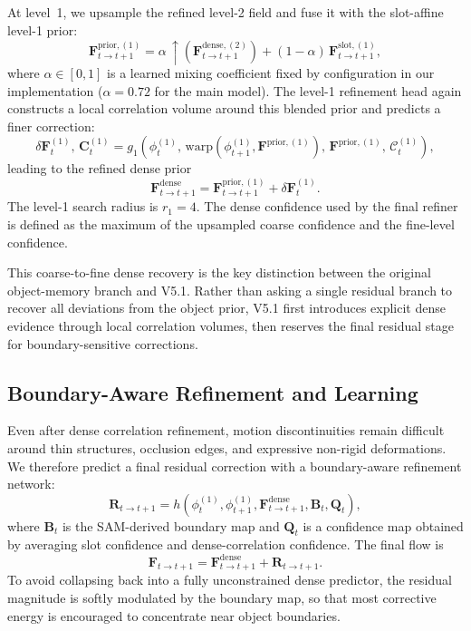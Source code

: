 At level~1, we upsample the refined level-2 field and fuse it with the slot-affine level-1 prior:
\begin{equation}
\label{eq:prior_blend}
\mathbf{F}^{\mathrm{prior},(1)}_{t\rightarrow t+1} = \alpha\,\uparrow\!\left(\mathbf{F}^{\mathrm{dense},(2)}_{t\rightarrow t+1}\right) + (1-\alpha)\,\mathbf{F}^{\mathrm{slot},(1)}_{t\rightarrow t+1},
\end{equation}
where $\alpha\in[0,1]$ is a learned mixing coefficient fixed by configuration in our implementation ($\alpha=0.72$ for the main model). The level-1 refinement head again constructs a local correlation volume around this blended prior and predicts a finer correction:
\begin{equation}
\delta \mathbf{F}_t^{(1)},\, \mathbf{C}_t^{(1)} = g_1\left(\phi_t^{(1)},\, \mathrm{warp}(\phi_{t+1}^{(1)},\mathbf{F}^{\mathrm{prior},(1)}),\, \mathbf{F}^{\mathrm{prior},(1)},\, \mathcal{C}_t^{(1)}\right),
\end{equation}
leading to the refined dense prior
\begin{equation}
\label{eq:dense_prior}
\mathbf{F}^{\mathrm{dense}}_{t\rightarrow t+1} = \mathbf{F}^{\mathrm{prior},(1)}_{t\rightarrow t+1} + \delta \mathbf{F}_t^{(1)}.
\end{equation}
The level-1 search radius is $r_1=4$. The dense confidence used by the final refiner is defined as the maximum of the upsampled coarse confidence and the fine-level confidence.

This coarse-to-fine dense recovery is the key distinction between the original object-memory branch and V5.1. Rather than asking a single residual branch to recover all deviations from the object prior, V5.1 first introduces explicit dense evidence through local correlation volumes, then reserves the final residual stage for boundary-sensitive corrections.

\subsection{Boundary-Aware Refinement and Learning}

Even after dense correlation refinement, motion discontinuities remain difficult around thin structures, occlusion edges, and expressive non-rigid deformations. We therefore predict a final residual correction with a boundary-aware refinement network:
\begin{equation}
\mathbf{R}_{t\rightarrow t+1} = h\left(\phi_t^{(1)},\phi_{t+1}^{(1)},\mathbf{F}^{\mathrm{dense}}_{t\rightarrow t+1},\mathbf{B}_t,\mathbf{Q}_t\right),
\end{equation}
where $\mathbf{B}_t$ is the SAM-derived boundary map and $\mathbf{Q}_t$ is a confidence map obtained by averaging slot confidence and dense-correlation confidence. The final flow is
\begin{equation}
\mathbf{F}_{t\rightarrow t+1} = \mathbf{F}^{\mathrm{dense}}_{t\rightarrow t+1} + \mathbf{R}_{t\rightarrow t+1}.
\end{equation}
To avoid collapsing back into a fully unconstrained dense predictor, the residual magnitude is softly modulated by the boundary map, so that most corrective energy is encouraged to concentrate near object boundaries.

